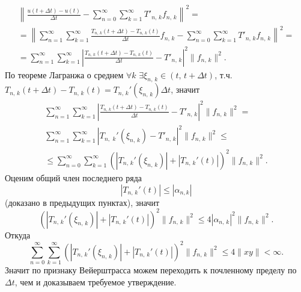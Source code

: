 \documentclass[a4paper]{article}
\begin{document}
\begin{sol}
\begin{enumerate}
\begin{enumerate}
\begin{multline*}
	 \left\lVert \frac{u(t+\Delta t)-u(t)}{\Delta t}- \sum_{n=0}^{\infty} \sum_{k=1}^{\infty} 
		T'_{n,\,k}f_{n,\,k}\right\rVert^2=\\=
	 \left\lVert \sum_{n=1}^{\infty} \sum_{k=1}^{\infty} \frac{T_{n,\,k}(t+\Delta t)-T_{n,\,k}(t)}{\Delta t}f_{n,\,k}- \sum_{n=0}^{\infty} \sum_{k=1}^{\infty} 
		T'_{n,\,k}f_{n,\,k}\right\rVert^2=\\=
	 \sum_{n=1}^{\infty} \sum_{k=1}^{\infty} \left| \frac{T_{n,\,k}(t+\Delta t)-T_{n,\,k}(t)}{\Delta t}- 
		T'_{n,\,k}\right|^2\| f_{n,\,k}\|^2
	.\end{multline*}
По теореме Лагранжа о среднем $\forall k$ $\exists \xi_{n,\,k}
\in (t,\,t+\Delta t)$, т.ч.
$T_{n,\,k}(t+\Delta t)-T_{n,\,k}(t)=T_{n,\,k}' (\xi_{n,\,k})\Delta t$, значит
\begin{multline*}
	 \sum_{n=1}^{\infty} \sum_{k=1}^{\infty} \left| \frac{T_{n,\,k}(t+\Delta t)-T_{n,\,k}(t)}{\Delta t}- 
		T'_{n,\,k}\right|^2\| f_{n,\,k}\|^2=\\
		\sum_{n=1}^{\infty} \sum_{k=1}^{\infty} \left| T_{n,\,\,k}'(\xi_{n,\,k})- 
		T'_{n,\,k}\right|^2\| f_{n,\,k}\|^2\le \\\le 
		\sum_{n=0}^{\infty} \sum_{k=1}^{\infty} 
		\left( |T_{n,\,k}'(\xi_{n,\,k})|+
		|T_{n,\,k}'(t)|\right) ^2 \| f_{n,\,k}\|^2
.\end{multline*} 
Оценим общий член последнего ряда
\[
	|T_{n,\,k}'(t)|\le |\alpha_{n,k}|
\]
(доказано в предыдущих пунктах), значит
\[
		\left( |T_{n,\,k}'(\xi_{n,\,k})|+
		|T_{n,\,k}'(t)|\right) ^2 \| f_{n,\,k}\|^2\le 
		4|\alpha_{n,\,k}|^2\| f_{n,\,k}\|^2
.\] 
Откуда
\[
		\sum_{n=0}^{\infty} \sum_{k=1}^{\infty} 
		\left( |T_{n,\,k}'(\xi_{n,\,k})|+
		|T_{n,\,k}'(t)|\right) ^2 \| f_{n,\,k}\|^2\le 
		4\| xy\|<\infty
.\] 
Значит по признаку Вейерштрасса можем переходить к почленному
пределу по $\Delta t$, чем и доказываем требуемое утверждение.
\end{enumerate}
\end{enumerate}
\end{sol}
\end{document}
